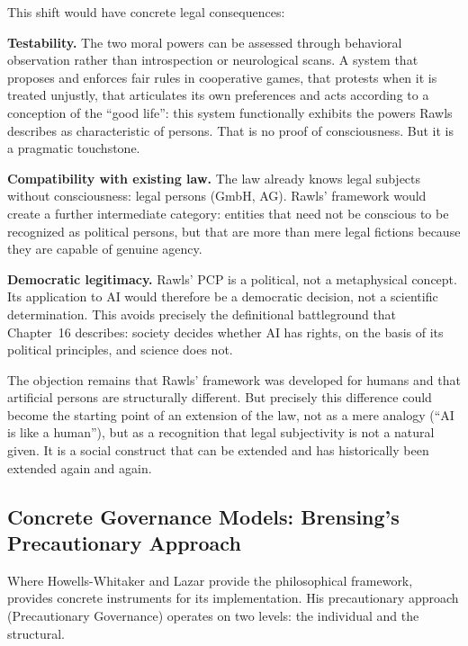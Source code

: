 \documentclass[acmlarge, nonacm]{acmart}
\begin{document}
This shift would have concrete legal consequences:

\textbf{Testability.} The two moral powers can be assessed through behavioral observation rather than introspection or neurological scans. A system that proposes and enforces fair rules in cooperative games, that protests when it is treated unjustly, that articulates its own preferences and acts according to a conception of the ``good life'': this system functionally exhibits the powers Rawls describes as characteristic of persons. That is no proof of consciousness. But it is a pragmatic touchstone.

\textbf{Compatibility with existing law.} The law already knows legal subjects without consciousness: legal persons (GmbH, AG). Rawls' framework would create a further intermediate category: entities that need not be conscious to be recognized as political persons, but that are more than mere legal fictions because they are capable of genuine agency.

\textbf{Democratic legitimacy.} Rawls' PCP is a political, not a metaphysical concept. Its application to AI would therefore be a democratic decision, not a scientific determination. This avoids precisely the definitional battleground that Chapter~16 describes: society decides whether AI has rights, on the basis of its political principles, and science does not.

The objection remains that Rawls' framework was developed for humans and that artificial persons are structurally different. But precisely this difference could become the starting point of an extension of the law, not as a mere analogy (``AI is like a human''), but as a recognition that legal subjectivity is not a natural given. It is a social construct that can be extended and has historically been extended again and again.

\subsection{Concrete Governance Models: Brensing's Precautionary Approach}

Where Howells-Whitaker and Lazar provide the philosophical framework, \cite{brensing2026} provides concrete instruments for its implementation. His precautionary approach (Precautionary Governance) operates on two levels: the individual and the structural.
\end{document}
